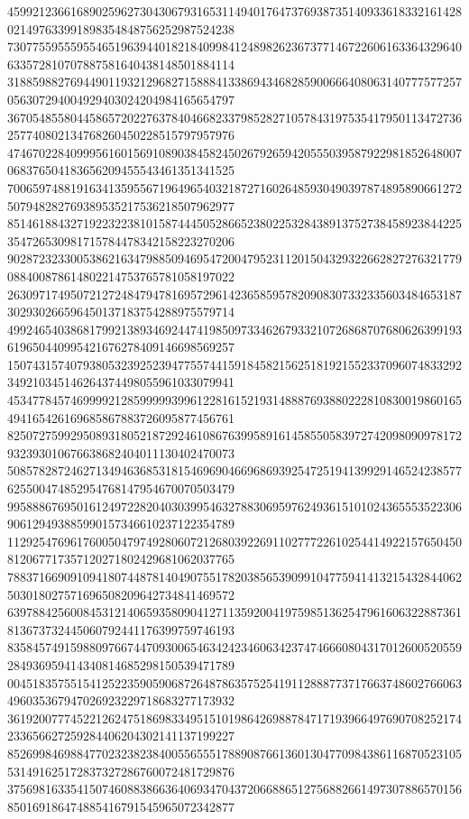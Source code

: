 \begin{DoxyCode}
      459921236616890259627304306793165311494017647376938735140933618332161428021497633991898354848756252987524238
      730775595559554651963944018218409984124898262367377146722606163364329640633572810707887581640438148501884114
      318859882769449011932129682715888413386943468285900666408063140777577257056307294004929403024204984165654797
      367054855804458657202276378404668233798528271057843197535417950113472736257740802134768260450228515797957976
      474670228409995616015691089038458245026792659420555039587922981852648007068376504183656209455543461351341525
      700659748819163413595567196496540321872716026485930490397874895890661272507948282769389535217536218507962977
      851461884327192232238101587444505286652380225328438913752738458923844225354726530981715784478342158223270206
      902872323300538621634798850946954720047952311201504329322662827276321779088400878614802214753765781058197022
      263097174950721272484794781695729614236585957820908307332335603484653187302930266596450137183754288975579714
      499246540386817992138934692447419850973346267933210726868707680626399193619650440995421676278409146698569257
      150743157407938053239252394775574415918458215625181921552337096074833292349210345146264374498055961033079941
      453477845746999921285999993996122816152193148887693880222810830019860165494165426169685867883726095877456761
      825072759929508931805218729246108676399589161458550583972742098090978172932393010676638682404011130402470073
      508578287246271349463685318154696904669686939254725194139929146524238577625500474852954768147954670070503479
      995888676950161249722820403039954632788306959762493615101024365553522306906129493885990157346610237122354789
      112925476961760050479749280607212680392269110277722610254414922157650450812067717357120271802429681062037765
      788371669091094180744878140490755178203856539099104775941413215432844062503018027571696508209642734841469572
      639788425600845312140659358090412711359200419759851362547961606322887361813673732445060792441176399759746193
      835845749159880976674470930065463424234606342374746660804317012600520559284936959414340814685298150539471789
      004518357551541252235905906872648786357525419112888773717663748602766063496035367947026923229718683277173932
      361920077745221262475186983349515101986426988784717193966497690708252174233656627259284406204302141137199227
      852699846988477023238238400556555178890876613601304770984386116870523105531491625172837327286760072481729876
      375698163354150746088386636406934704372066886512756882661497307886570156850169186474885416791545965072342877

\end{DoxyCode}
